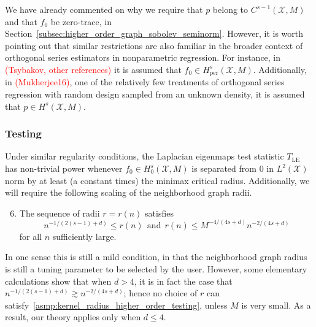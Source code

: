 \documentclass{article}
\newcommand{\1}{\mathbf{1}}
\newcommand{\Xset}{\mathcal{X}}
\newcommand{\Leb}{L}
\newcommand{\LE}{\mathrm{LE}}
\theoremstyle{alden}
\theoremstyle{aldenthm}
\theoremstyle{definition}
\theoremstyle{remark}
\begin{document}
We have already commented on why we require that $p$ belong to $C^{s-1}(\Xset,M)$ and that $f_0$ be zero-trace, in Section~\ref{subsec:higher_order_graph_sobolev_seminorm}. However, it is worth pointing out that similar restrictions are also familiar in the broader context of orthogonal series estimators in nonparametric regression. For instance, in \textcolor{red}{(Tsybakov, other references)} it is assumed that $f_0 \in H_{\mathrm{per}}^s(\Xset,M)$. Additionally, in \textcolor{red}{(Mukherjee16)}, one of the relatively few treatments of orthogonal series regression with random design sampled from an unknown density, it is assumed that $p \in H^s(\Xset,M)$. 

\subsubsection{Testing}
\label{subsec:minimax_testing_higher_order}

Under similar regularity conditions, the Laplacian eigenmaps test statistic $T_{\LE}$ has non-trivial power whenever $f_0 \in H_0^s(\Xset,M)$ is separated from $0$ in $\Leb^2(\Xset)$ norm by at least (a constant times) the minimax critical radius. Additionally, we will require the following scaling of the neighborhood graph radii.
\begin{enumerate}[label=(R\arabic*)]
	\setcounter{enumi}{5}
	\item 
	\label{asmp:kernel_radius_higher_order_testing}
	The sequence of radii $r = r(n)$ satisfies
	\begin{equation*}
	n^{-1/(2(s - 1) + d)} \leq r(n)~~\textrm{and}~~ r(n) \leq M^{-4/(4s + d)}n^{-2/(4s + d)}
	\end{equation*}
	for all $n$ sufficiently large.
\end{enumerate}
In one sense this is still a mild condition, in that the neighborhood graph radius is still a tuning parameter to be selected by the user. However, some elementary calculations show that when $d > 4$, it is in fact the case that $n^{-1/(2(s - 1) + d)} \gtrsim n^{-2/(4s + d)}$; hence no choice of $r$ can satisfy~\ref{asmp:kernel_radius_higher_order_testing}, unless $M$ is very small. As a result, our theory applies only when $d \leq 4$.
\end{document}
